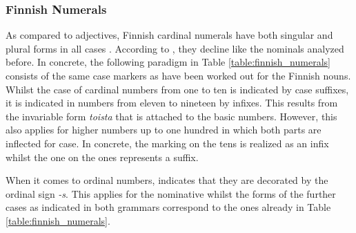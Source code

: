 \documentclass[11pt,a4paper,twoside,openright]{scrbook}
\begin{document}
\subsubsection{Finnish Numerals}

As compared to adjectives, Finnish cardinal numerals have both singular and plural forms in all cases \citep{white2008finn}. According to \citet{karlsson2018finn}, they decline like the nominals analyzed before. In concrete, the following paradigm in Table \ref{table:finnish_numerals} consists of the same case markers as have been worked out for the Finnish nouns. Whilst the case of cardinal numbers from one to ten is indicated by case suffixes, it is indicated in numbers from eleven to nineteen by infixes. This results from the invariable form \textit{toista} that is attached to the basic numbers. However, this also applies for higher numbers up to one hundred in which both parts are inflected for case. In concrete, the marking on the tens is realized as an infix whilst the one on the ones represents a suffix.

When it comes to ordinal numbers, \citet{white2008finn} indicates that they are decorated by the ordinal sign \textit{-s}. This applies for the nominative whilst the forms of the further cases as indicated in both grammars correspond to the ones already in Table \ref{table:finnish_numerals}.
\end{document}
